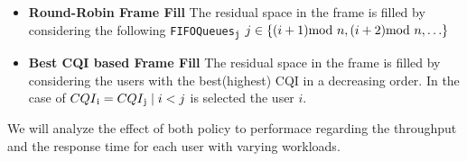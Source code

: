 \begin{itemize}
  \item \textbf{Round-Robin Frame Fill}
  The residual space  in the frame is filled by considering the following \texttt{FIFOQueues\textsubscript{j}} \(j \in \{ (i+1)\textnormal{mod } n,(i+2)\textnormal{mod }n,\ldots \} \)
  \item \textbf{Best CQI based Frame Fill}
   The residual space in the frame is filled by considering the users with the best(highest) CQI in a decreasing order. In the case of \(CQI\textsubscript{i}=CQI\textsubscript{j} \mid i < j\) is selected the user \(i\).
\end{itemize}
We will analyze the effect of both policy to performace regarding the throughput and the response time for each user with varying workloads.

